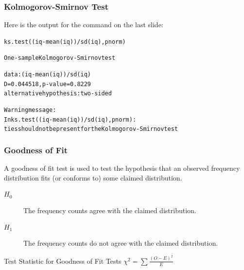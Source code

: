 \documentclass[xcolor=dvipsnames]{beamer}
\begin{document}
\begin{frame}[fragile]
  \frametitle{Kolmogorov-Smirnov Test}
  Here is the output for the command on the last slide:
\begin{alltt}
ks.test((iq-mean(iq))/sd(iq),pnorm)  

	One-sample Kolmogorov-Smirnov test  

data:  (iq - mean(iq))/sd(iq) 
D = 0.044518, p-value = 0.8229 
alternative hypothesis: two-sided  

Warning message: 
In ks.test((iq - mean(iq))/sd(iq), pnorm) : 
  ties should not be present for the Kolmogorov-Smirnov test
\end{alltt}
\end{frame}

\begin{frame}
  \frametitle{Goodness of Fit}
  A \alert{goodness of fit} test is used to test the hypothesis
  that an observed frequency distribution fits (or conforms to)
  some claimed distribution.

  \begin{description}
  \item[$H_{0}$] The frequency counts agree with the claimed
    distribution.
  \item[$H_{1}$]  The frequency counts do not agree with the claimed
    distribution.
  \end{description}

  \bigskip

  \begin{block}{Test Statistic for Goodness of Fit Tests}
    $\displaystyle \chi^{2}=\sum\frac{(O-E)^{2}}{E}$
  \end{block}
\end{frame}
\end{document}
